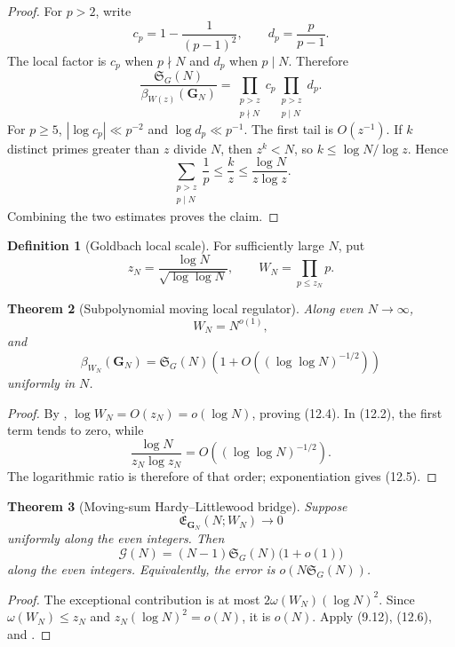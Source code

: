 \documentclass[11pt]{article}
\newtheorem{theorem}{Theorem}[section]
\theoremstyle{definition}
\newtheorem{definition}[theorem]{Definition}
\theoremstyle{remark}
\begin{document}
\begin{proof}
For $p>2$, write
\[
 c_p=1-\frac1{(p-1)^2},
 \qquad d_p=\frac p{p-1}.
\]
The local factor is $c_p$ when $p\nmid N$ and $d_p$ when $p\mid N$.  Therefore
\[
 \frac{\mathfrak S_G(N)}{\beta_{W(z)}(\bm G_N)}
 =\prod_{\substack{p>z\\p\nmid N}}c_p
  \prod_{\substack{p>z\\p\mid N}}d_p.
\]
For $p\ge5$,
$|\log c_p|\ll p^{-2}$ and $\log d_p\ll p^{-1}$.  The first tail is
$O(z^{-1})$.  If $k$ distinct primes greater than $z$ divide $N$, then
$z^k<N$, so $k\le\log N/\log z$.  Hence
\[
 \sum_{\substack{p>z\\p\mid N}}\frac1p
 \le\frac{k}{z}
 \le\frac{\log N}{z\log z}.
\]
Combining the two estimates proves the claim.
\end{proof}

\begin{definition}[Goldbach local scale]
For sufficiently large $N$, put
\[
 \boxed{
 z_N=\frac{\log N}{\sqrt{\log\log N}},
 \qquad W_N=\prod_{p\le z_N}p.}
 \tag{12.3}
\]
\end{definition}

\begin{theorem}[Subpolynomial moving local regulator]
\label{thm:Goldbach-regulator}
Along even $N\to\infty$,
\[
 \boxed{W_N=N^{o(1)},}
 \tag{12.4}
\]
and
\[
 \boxed{
 \beta_{W_N}(\bm G_N)
 =\mathfrak S_G(N)
  \left(1+O\left((\log\log N)^{-1/2}\right)\right)}
 \tag{12.5}
\]
uniformly in $N$.
\end{theorem}

\begin{proof}
By ,
$\log W_N=O(z_N)=o(\log N)$, proving \textup{(12.4)}.  In
\textup{(12.2)}, the first term tends to zero, while
\[
 \frac{\log N}{z_N\log z_N}
 =O\left((\log\log N)^{-1/2}\right).
\]
The logarithmic ratio is therefore of that order; exponentiation gives
\textup{(12.5)}.
\end{proof}

\begin{theorem}[Moving-sum Hardy--Littlewood bridge]
\label{thm:Goldbach-HL-bridge}
Suppose
\[
 \boxed{
 \mathfrak E_{\bm G_N}(N;W_N)\longrightarrow0}
 \tag{12.6}
\]
uniformly along the even integers.  Then
\[
 \boxed{
 \mathcal G(N)
 =(N-1)\mathfrak S_G(N)\bigl(1+o(1)\bigr)}
 \tag{12.7}
\]
along the even integers.  Equivalently, the error is
$o\!\left(N\mathfrak S_G(N)\right)$.
\end{theorem}

\begin{proof}
The exceptional contribution is at most
$2\omega(W_N)(\log N)^2$.  Since
$\omega(W_N)\le z_N$ and $z_N(\log N)^2=o(N)$, it is $o(N)$.  Apply
\textup{(9.12)}, \textup{(12.6)}, and .
\end{proof}
\end{document}

